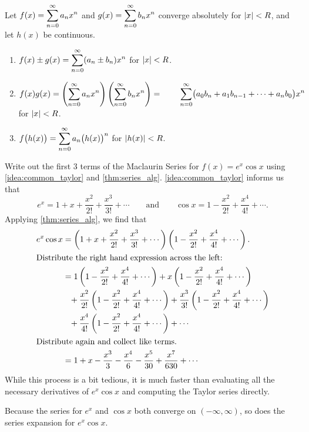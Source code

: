 \begin{theorem}\label{thm:series_alg}%
Let $\displaystyle f(x) = \sum_{n=0}^\infty a_nx^n$ and $\displaystyle g(x) = \sum_{n=0}^\infty b_nx^n$ converge absolutely for $\left\lvert x \right\rvert<R$, and let $h(x)$ be continuous.
\begin{enumerate}
	\item	$\displaystyle f(x)\pm g(x) = \sum_{n=0}^\infty (a_n\pm b_n)x^n$ \quad for $\left\lvert x \right\rvert<R$.
	\item	$\displaystyle f(x)g(x) = \left(\sum_{n=0}^\infty a_nx^n\right)\left(\sum_{n=0}^\infty b_nx^n\right) =\\
	\mbox{}\qquad
	\sum_{n=0}^\infty\bigl(a_0b_n+a_1b_{n-1}+\dotsb+ a_nb_0\bigr)x^n$ for $\left\lvert x \right\rvert<R$.
	\item	$\displaystyle f\bigl(h(x)\bigr) = \sum_{n=0}^\infty a_n\bigl(h(x)\bigr)^n$ \quad for $\left\lvert h(x) \right\rvert<R$.
\end{enumerate}
\end{theorem}

\begin{example}\label{ex_ts5}%
Write out the first 3 terms of the Maclaurin Series for $f(x) = e^x\cos x$ using \autoref{idea:common_taylor} and \autoref{thm:series_alg}.
\solution
\autoref{idea:common_taylor} informs us that 
\[e^x = 1+x+\frac{x^2}{2!}+\frac{x^3}{3!}+\dotsb\qquad \text{and}\qquad \cos x = 1-\frac{x^2}{2!}+\frac{x^4}{4!}+\dotsb.\]
Applying \autoref{thm:series_alg}, we find that
\begin{align*}
e^x\cos x &= \left(1+x+\frac{x^2}{2!}+\frac{x^3}{3!}+\dotsb\right)\left(1-\frac{x^2}{2!}+\frac{x^4}{4!}+\dotsb\right).\\
\intertext{Distribute the right hand expression across the left:}
	&= 1\left(1-\frac{x^2}{2!}+\frac{x^4}{4!}+\dotsb\right)
	+x\left(1-\frac{x^2}{2!}+\frac{x^4}{4!}+\dotsb\right)\\
	&\phantom{=}+\frac{x^2}{2!}\left(1-\frac{x^2}{2!}+\frac{x^4}{4!}+\dotsb\right)
	+\frac{x^3}{3!}\left(1-\frac{x^2}{2!}+\frac{x^4}{4!}+\dotsb\right)\\
	&\phantom{=}+ \frac{x^4}{4!}\left(1-\frac{x^2}{2!}+\frac{x^4}{4!}+\dotsb\right)+\dotsb\\
	\intertext{Distribute again and collect like terms.}
	&= 1 + x -\frac{x^3}{3}-\frac{x^4}{6} - \frac{x^5}{30}+\frac{x^7}{630}+\dotsb
\end{align*}
While this process is a bit tedious, it is much faster than evaluating all the necessary derivatives of $e^x\cos x$ and computing the Taylor series directly.

Because the series for $e^x$ and $\cos x$ both converge on $(-\infty,\infty)$, so does the series expansion for $e^x\cos x$.
\end{example}

